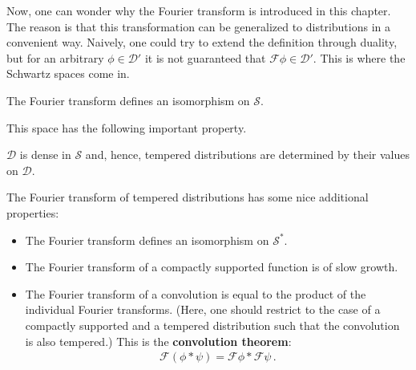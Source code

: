     Now, one can wonder why the Fourier transform is introduced in this chapter. The reason is that this transformation can be generalized to distributions in a convenient way. Naively, one could try to extend the definition through duality, but for an arbitrary $\phi\in\mathcal{D}'$ it is not guaranteed that $\mathcal{F}\phi\in\mathcal{D}'$. This is where the Schwartz spaces come in.
    \begin{property}
        The Fourier transform defines an isomorphism on $\mathscr{S}$.
    \end{property}


    This space has the following important property.
    \begin{property}
        $\mathcal{D}$ is dense in $\mathscr{S}$ and, hence, tempered distributions are determined by their values on $\mathcal{D}$.
    \end{property}

    \begin{property}
        The Fourier transform of tempered distributions has some nice additional properties:
        \begin{itemize}
            \item The Fourier transform defines an isomorphism on $\mathscr{S}^*$.
            \item The Fourier transform of a compactly supported function is of slow growth.
            \item The Fourier transform of a convolution is equal to the product of the individual Fourier transforms. (Here, one should restrict to the case of a compactly supported and a tempered distribution such that the convolution is also tempered.) This is the \textbf{convolution theorem}:
            \begin{gather}
                \label{distributions:convolution_theorem}
                \mathcal{F}(\phi\ast\psi) = \mathcal{F}\phi\ast\mathcal{F}\psi\,.
            \end{gather}
        \end{itemize}
    \end{property}

